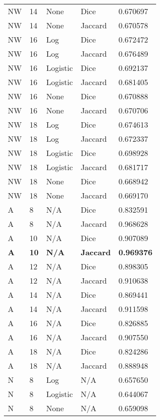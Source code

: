 \documentclass{article}
\begin{document}
\begin{center}
\begin{supertabular}{| l | l | l | l | l |}
            NW & 14 & None & Dice & 0.670697 \\
            NW & 14 & None & Jaccard & 0.670578 \\
            NW & 16 & Log & Dice & 0.672472 \\
            NW & 16 & Log & Jaccard & 0.676489 \\
            NW & 16 & Logistic & Dice & 0.692137 \\
            NW & 16 & Logistic & Jaccard & 0.681405 \\
            NW & 16 & None & Dice & 0.670888 \\
            NW & 16 & None & Jaccard & 0.670706 \\
            NW & 18 & Log & Dice & 0.674613 \\
            NW & 18 & Log & Jaccard & 0.672337 \\
            NW & 18 & Logistic & Dice & 0.698928 \\
            NW & 18 & Logistic & Jaccard & 0.681717 \\
            NW & 18 & None & Dice & 0.668942 \\
            NW & 18 & None & Jaccard & 0.669170 \\
            A & 8 & N/A & Dice & 0.832591 \\
            A & 8 & N/A & Jaccard & 0.968628 \\
            A & 10 & N/A & Dice & 0.907089 \\
            \textbf{A} & \textbf{10} & \textbf{N/A} & \textbf{Jaccard} & \textbf{0.969376} \\
            A & 12 & N/A & Dice & 0.898305 \\
            A & 12 & N/A & Jaccard & 0.910638 \\
            A & 14 & N/A & Dice & 0.869441 \\
            A & 14 & N/A & Jaccard & 0.911598 \\
            A & 16 & N/A & Dice & 0.826885 \\
            A & 16 & N/A & Jaccard & 0.907550 \\
            A & 18 & N/A & Dice & 0.824286 \\
            A & 18 & N/A & Jaccard & 0.888948 \\
            N & 8 & Log & N/A & 0.657650 \\
            N & 8 & Logistic & N/A & 0.644067 \\
            N & 8 & None & N/A & 0.659098 \\

\end{supertabular}
\end{center}
\end{document}
